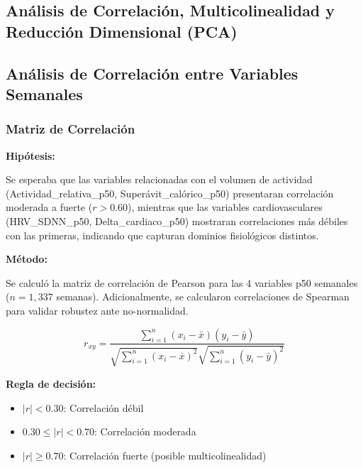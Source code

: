 \documentclass[12pt,letterpaper,twoside]{report}
\begin{document}
\begin{calculobox}
\chapter{Análisis de Correlación, Multicolinealidad y Reducción Dimensional (PCA)}

\section{Análisis de Correlación entre Variables Semanales}

\subsection{Matriz de Correlación}

\begin{hipotesisbox}
\textbf{Hipótesis:}

Se esperaba que las variables relacionadas con el volumen de actividad (Actividad\_relativa\_p50, Superávit\_calórico\_p50) presentaran correlación moderada a fuerte ($r > 0.60$), mientras que las variables cardiovasculares (HRV\_SDNN\_p50, Delta\_cardiaco\_p50) mostraran correlaciones más débiles con las primeras, indicando que capturan dominios fisiológicos distintos.
\end{hipotesisbox}

\begin{estadisticobox}
\textbf{Método:}

Se calculó la matriz de correlación de Pearson para las 4 variables p50 semanales ($n=1,337$ semanas). Adicionalmente, se calcularon correlaciones de Spearman para validar robustez ante no-normalidad.

\begin{equation}
r_{xy} = \frac{\sum_{i=1}^{n}(x_i - \bar{x})(y_i - \bar{y})}{\sqrt{\sum_{i=1}^{n}(x_i - \bar{x})^2}\sqrt{\sum_{i=1}^{n}(y_i - \bar{y})^2}}
\end{equation}
\end{estadisticobox}

\begin{reglabox}
\textbf{Regla de decisión:}

\begin{itemize}[noitemsep]
    \item $|r| < 0.30$: Correlación débil
    \item $0.30 \leq |r| < 0.70$: Correlación moderada
    \item $|r| \geq 0.70$: Correlación fuerte (posible multicolinealidad)
\end{itemize}
\end{reglabox}


\end{calculobox}
\end{document}

